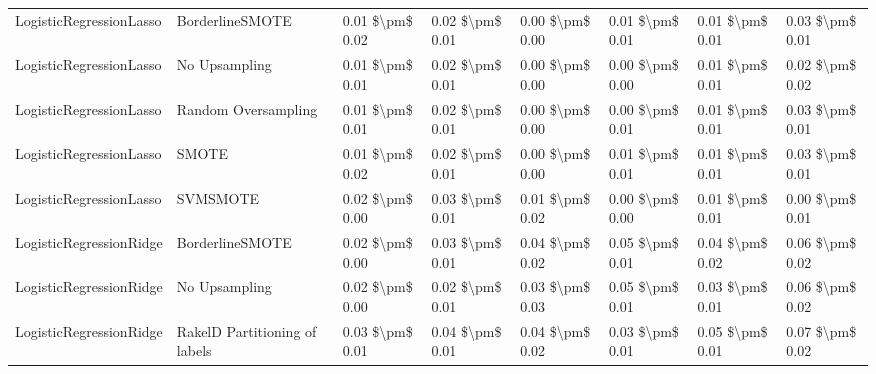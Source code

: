 \begin{tabular}{llllllll}
        LogisticRegressionLasso &               BorderlineSMOTE & 0.01 \$\textbackslash pm\$ 0.02 &           0.02 \$\textbackslash pm\$ 0.01 &       0.00 \$\textbackslash pm\$ 0.00 &        0.01 \$\textbackslash pm\$ 0.01 &                         0.01 \$\textbackslash pm\$ 0.01 &     0.03 \$\textbackslash pm\$ 0.01 \\
        LogisticRegressionLasso &                 No Upsampling & 0.01 \$\textbackslash pm\$ 0.01 &           0.02 \$\textbackslash pm\$ 0.01 &       0.00 \$\textbackslash pm\$ 0.00 &        0.00 \$\textbackslash pm\$ 0.00 &                         0.01 \$\textbackslash pm\$ 0.01 &     0.02 \$\textbackslash pm\$ 0.02 \\
        LogisticRegressionLasso &           Random Oversampling & 0.01 \$\textbackslash pm\$ 0.01 &           0.02 \$\textbackslash pm\$ 0.01 &       0.00 \$\textbackslash pm\$ 0.00 &        0.00 \$\textbackslash pm\$ 0.01 &                         0.01 \$\textbackslash pm\$ 0.01 &     0.03 \$\textbackslash pm\$ 0.01 \\
        LogisticRegressionLasso &                         SMOTE & 0.01 \$\textbackslash pm\$ 0.02 &           0.02 \$\textbackslash pm\$ 0.01 &       0.00 \$\textbackslash pm\$ 0.00 &        0.01 \$\textbackslash pm\$ 0.01 &                         0.01 \$\textbackslash pm\$ 0.01 &     0.03 \$\textbackslash pm\$ 0.01 \\
        LogisticRegressionLasso &                      SVMSMOTE & 0.02 \$\textbackslash pm\$ 0.00 &           0.03 \$\textbackslash pm\$ 0.01 &       0.01 \$\textbackslash pm\$ 0.02 &        0.00 \$\textbackslash pm\$ 0.00 &                         0.01 \$\textbackslash pm\$ 0.01 &     0.00 \$\textbackslash pm\$ 0.01 \\
        LogisticRegressionRidge &               BorderlineSMOTE & 0.02 \$\textbackslash pm\$ 0.00 &           0.03 \$\textbackslash pm\$ 0.01 &       0.04 \$\textbackslash pm\$ 0.02 &        0.05 \$\textbackslash pm\$ 0.01 &                         0.04 \$\textbackslash pm\$ 0.02 &     0.06 \$\textbackslash pm\$ 0.02 \\
        LogisticRegressionRidge &                 No Upsampling & 0.02 \$\textbackslash pm\$ 0.00 &           0.02 \$\textbackslash pm\$ 0.01 &       0.03 \$\textbackslash pm\$ 0.03 &        0.05 \$\textbackslash pm\$ 0.01 &                         0.03 \$\textbackslash pm\$ 0.01 &     0.06 \$\textbackslash pm\$ 0.02 \\
        LogisticRegressionRidge & RakelD Partitioning of labels & 0.03 \$\textbackslash pm\$ 0.01 &           0.04 \$\textbackslash pm\$ 0.01 &       0.04 \$\textbackslash pm\$ 0.02 &        0.03 \$\textbackslash pm\$ 0.01 &                         0.05 \$\textbackslash pm\$ 0.01 &     0.07 \$\textbackslash pm\$ 0.02 \\

\end{tabular}
